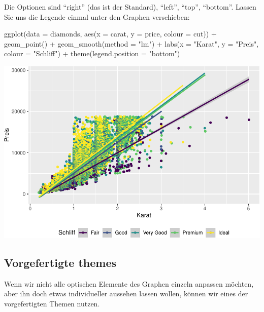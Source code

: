 \documentclass[
]{book}
\newenvironment{Shaded}{\begin{snugshade}}{\end{snugshade}}
\newcommand{\AttributeTok}[1]{\textcolor[rgb]{0.77,0.63,0.00}{#1}}
\newcommand{\FunctionTok}[1]{\textcolor[rgb]{0.00,0.00,0.00}{#1}}
\newcommand{\NormalTok}[1]{#1}
\newcommand{\SpecialCharTok}[1]{\textcolor[rgb]{0.00,0.00,0.00}{#1}}
\newcommand{\StringTok}[1]{\textcolor[rgb]{0.31,0.60,0.02}{#1}}
\begin{document}
Die Optionen sind ``right'' (das ist der Standard), ``left'', ``top'', ``bottom''. Lassen Sie uns die Legende einmal unter den Graphen verschieben:

\begin{Shaded}
\begin{Highlighting}[]
\FunctionTok{ggplot}\NormalTok{(}\AttributeTok{data =}\NormalTok{ diamonds, }\FunctionTok{aes}\NormalTok{(}\AttributeTok{x =}\NormalTok{ carat, }\AttributeTok{y =}\NormalTok{ price, }\AttributeTok{colour =}\NormalTok{ cut)) }\SpecialCharTok{+}
  \FunctionTok{geom\_point}\NormalTok{() }\SpecialCharTok{+}
  \FunctionTok{geom\_smooth}\NormalTok{(}\AttributeTok{method =} \StringTok{"lm"}\NormalTok{) }\SpecialCharTok{+}
  \FunctionTok{labs}\NormalTok{(}\AttributeTok{x =} \StringTok{"Karat"}\NormalTok{, }\AttributeTok{y =} \StringTok{"Preis"}\NormalTok{, }\AttributeTok{colour =} \StringTok{"Schliff"}\NormalTok{) }\SpecialCharTok{+}
  \FunctionTok{theme}\NormalTok{(}\AttributeTok{legend.position =} \StringTok{"bottom"}\NormalTok{)}
\end{Highlighting}
\end{Shaded}

\includegraphics{CFH_R_bookdown_files/figure-latex/unnamed-chunk-180-1.pdf}

\hypertarget{vorgefertigte-themes}{%
\subsection{Vorgefertigte themes}\label{vorgefertigte-themes}}

Wenn wir nicht alle optischen Elemente des Graphen einzeln anpassen möchten, aber ihn doch etwas individueller aussehen lassen wollen, können wir eines der vorgefertigten Themen nutzen.
\end{document}
